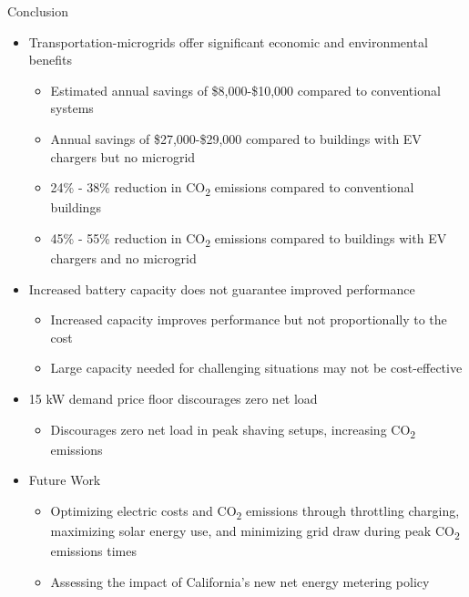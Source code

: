 \documentclass[final, 20 pt]{beamer}
\newlength{\onecolwid}
\begin{document}
\begin{frame}[t]
\begin{columns}[t]
\begin{column}{\onecolwid}
\begin{block}{Conclusion}
	\begin{itemize} 
		\item Transportation-microgrids offer significant economic and environmental benefits
		\begin{itemize} 
			\item Estimated annual savings of \$8,000-\$10,000 compared to conventional systems
			\item Annual savings of \$27,000-\$29,000 compared to buildings with EV chargers but no microgrid
			\item 24\% - 38\% reduction in CO\textsubscript{2} emissions compared to conventional buildings
			\item 45\% - 55\% reduction in CO\textsubscript{2} emissions compared to buildings with EV chargers and no microgrid
		\end{itemize}
		\item Increased battery capacity does not guarantee improved performance
		\begin{itemize} 
			\item Increased capacity improves performance but not proportionally to the cost
			\item Large capacity needed for challenging situations may not be cost-effective 
		\end{itemize}
		\item 15 kW demand price floor discourages zero net load
		\begin{itemize} 
			\item Discourages zero net load in peak shaving setups, increasing CO\textsubscript{2} emissions
		\end{itemize}
		\item Future Work
		\begin{itemize} 
			\item Optimizing electric costs and CO\textsubscript{2} emissions through throttling charging, maximizing solar energy use, and minimizing grid draw during peak CO\textsubscript{2} emissions times
			\item Assessing the impact of California's new net energy metering policy
		\end{itemize}
	\end{itemize}
\end{block}




\end{column}
\end{columns}
\end{frame}
\end{document}

